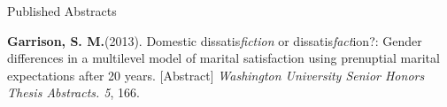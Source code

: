 \documentclass {resume}
\newcommand{\meb}{{\bf Garrison, S. M.}\xspace}
\begin{document}
\begin{samepage}\begin{rSection}{\textrm{Published Abstracts}}
\begin{etaremune}\item\meb (2013). Domestic dissatis{\em fiction} or dissatis{\em fact}ion?: Gender differences in a multilevel model of marital satisfaction using prenuptial marital expectations after 20 years. [Abstract] {\em Washington University Senior Honors Thesis Abstracts. 5}, 166.\end{etaremune}\end{rSection}\end{samepage}%

\end{document}
